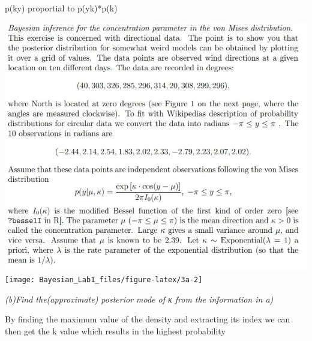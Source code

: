 \documentclass[]{article}
\begin{document}
p(k\textbar y) proportial to p(y\textbar k)*p(k)

\includegraphics[width=0.6\linewidth]{3a}
\texttt{[image: Bayesian\_Lab1\_files/figure-latex/3a-2]}

\emph{(b)Find the(approximate) posterior mode of κ from the information
in a)}

By finding the maximum value of the density and extracting its index we
can then get the k value which results in the highest probability
\end{document}

